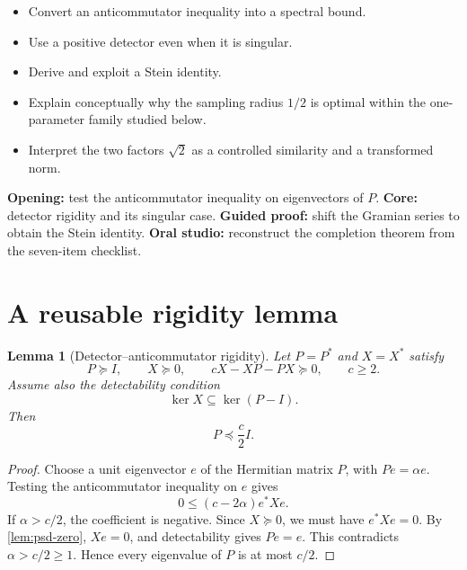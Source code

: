 \documentclass[11pt,oneside,openany]{book}
\newtheorem{lemma}[theorem]{Lemma}
\theoremstyle{definition}
\theoremstyle{remark}
\begin{document}
\begin{learninggoals}
\begin{itemize}
  \item Convert an anticommutator inequality into a spectral bound.
  \item Use a positive detector even when it is singular.
  \item Derive and exploit a Stein identity.
  \item Explain conceptually why the sampling radius \(1/2\) is
  optimal within the one-parameter family studied below.
  \item Interpret the two factors \(\sqrt2\) as a controlled
  similarity and a transformed norm.
\end{itemize}
\end{learninggoals}

\begin{workshopplan}
\textbf{Opening:} test the anticommutator inequality on eigenvectors
of \(P\). \textbf{Core:} detector rigidity and its singular case.
\textbf{Guided proof:} shift the Gramian series to obtain the Stein
identity. \textbf{Oral studio:} reconstruct the completion theorem
from the seven-item checklist.
\end{workshopplan}

\section{A reusable rigidity lemma}

\begin{lemma}[Detector--anticommutator rigidity]
\label{lem:detector-rigidity}
Let \(P=P^*\) and \(X=X^*\) satisfy
\begin{equation}
  P\succeq I,\qquad
  X\succeq0,\qquad
  cX-XP-PX\succeq0,
  \qquad c\geq2.
  \label{eq:rigidity-hypotheses}
\end{equation}
Assume also the detectability condition
\begin{equation}
  \ker X\subseteq\ker(P-I).
  \label{eq:detectability}
\end{equation}
Then
\[
  P\preceq\frac c2 I.
\]
\end{lemma}

\begin{proof}
Choose a unit eigenvector \(e\) of the Hermitian matrix \(P\), with
\(Pe=\alpha e\).  Testing the anticommutator inequality on \(e\)
gives
\[
  0\leq(c-2\alpha)e^*Xe.
\]
If \(\alpha>c/2\), the coefficient is negative.  Since \(X\succeq0\),
we must have \(e^*Xe=0\).  By \cref{lem:psd-zero}, \(Xe=0\), and
detectability gives \(Pe=e\).  This contradicts
\(\alpha>c/2\geq1\).  Hence every eigenvalue of \(P\) is at most
\(c/2\).
\end{proof}
\end{document}
